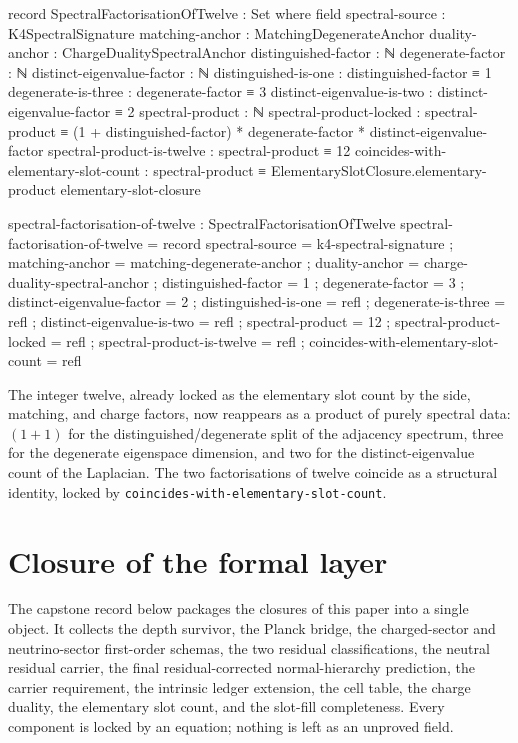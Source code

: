 \documentclass[11pt]{article}
\begin{document}
\begin{code}
record SpectralFactorisationOfTwelve : Set where
  field
    spectral-source                : K4SpectralSignature
    matching-anchor                : MatchingDegenerateAnchor
    duality-anchor                 : ChargeDualitySpectralAnchor
    distinguished-factor           : ℕ
    degenerate-factor              : ℕ
    distinct-eigenvalue-factor     : ℕ
    distinguished-is-one           : distinguished-factor ≡ 1
    degenerate-is-three            : degenerate-factor ≡ 3
    distinct-eigenvalue-is-two     : distinct-eigenvalue-factor ≡ 2
    spectral-product               : ℕ
    spectral-product-locked        :
      spectral-product
        ≡ (1 + distinguished-factor) * degenerate-factor
            * distinct-eigenvalue-factor
    spectral-product-is-twelve     :
      spectral-product ≡ 12
    coincides-with-elementary-slot-count :
      spectral-product
        ≡ ElementarySlotClosure.elementary-product
            elementary-slot-closure

spectral-factorisation-of-twelve : SpectralFactorisationOfTwelve
spectral-factorisation-of-twelve = record
  { spectral-source                = k4-spectral-signature
  ; matching-anchor                = matching-degenerate-anchor
  ; duality-anchor                 = charge-duality-spectral-anchor
  ; distinguished-factor           = 1
  ; degenerate-factor              = 3
  ; distinct-eigenvalue-factor     = 2
  ; distinguished-is-one           = refl
  ; degenerate-is-three            = refl
  ; distinct-eigenvalue-is-two     = refl
  ; spectral-product               = 12
  ; spectral-product-locked        = refl
  ; spectral-product-is-twelve     = refl
  ; coincides-with-elementary-slot-count = refl
  }
\end{code}

The integer twelve, already locked as the elementary slot count by the
side, matching, and charge factors, now reappears as a product of
purely spectral data: $(1+1)$ for the distinguished/degenerate split of
the adjacency spectrum, three for the degenerate eigenspace dimension,
and two for the distinct-eigenvalue count of the Laplacian.  The two
factorisations of twelve coincide as a structural identity, locked by
\texttt{coincides-with-elementary-slot-count}.

\section{Closure of the formal layer}

The capstone record below packages the closures of this paper into a
single object.  It collects the depth survivor, the Planck bridge, the
charged-sector and neutrino-sector first-order schemas, the two
residual classifications, the neutral residual carrier, the final
residual-corrected normal-hierarchy prediction, the carrier requirement,
the intrinsic ledger extension, the cell table, the charge duality, the
elementary slot count, and the slot-fill completeness.  Every component
is locked by an equation; nothing is left as an unproved field.
\end{document}
